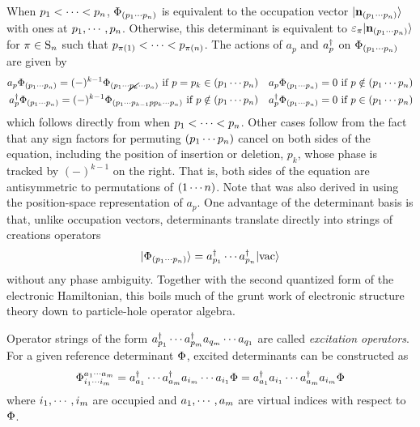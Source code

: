 \documentclass[11pt]{article}
\numberwithin{equation}{section}
\begin{document}
\begin{rmk}
When $p_1<\cdots<p_n$, $\Phi _{(p_1\cdots p_n)}$ is equivalent to the occupation vector $|\mathbf{n}_{(p_1\cdots p_n)}\rangle$ with ones at $p_1,\cdots,p_n$.
Otherwise, this determinant is equivalent to $\e_{\pi}\kt{\bo{n}_{(p_1\cd p_n)}}$ for $\pi\in\mr{S}_n$ such that $p_{\pi(1)}<\cd<p_{\pi(n)}$.
The actions of $a_p$ and $a_p^\dagger$ on $\Phi _{(p_1\cdots p_n)}$ are given by
\begin{align}\label{eq:abstract-annihilation-operator-action}
  a_p\Phi _{(p_1\cdots p_n)}
=
  (-)^{k-1}\Phi _{(p_1\cdots\cancel{p_k}\cdots p_n)}
  \ \text{if $p=p_k\in(p_1\cdots p_n)$}
&&
  a_p\Phi _{(p_1\cdots p_n)}
=
  0
  \ \text{if $p\notin(p_1\cdots p_n)$}
\\\label{eq:abstract-creation-operator-action}
  a_p^\dagger\Phi _{(p_1\cdots p_n)}
=
  (-)^{k-1}\Phi _{(p_1\cdots p_{k-1}pp_k\cdots p_n)}
  \ \text{if $p\notin(p_1\cdots p_n)$}
&&
  a_p^\dagger\Phi _{(p_1\cdots p_n)}
=
  0
  \ \text{if $p\in(p_1\cdots p_n)$}
\end{align}
which follows directly from  when $p_1<\cdots<p_n$.
Other cases follow from the fact that any sign factors for permuting $(p_1\cdots p_n)$ cancel on both sides of the equation, including the position of insertion or deletion, $p_k$, whose phase is tracked by $(-)^{k-1}$ on the right.
That is, both sides of the equation are antisymmetric to permutations of $(1\cdots n)$.
Note that  was also derived in  using the position-space representation of $a_p$.
One advantage of the determinant basis is that, unlike occupation vectors, determinants translate directly into strings of creations operators
\begin{align}
  |\Phi _{(p_1\cdots p_n)}\rangle
=
  a_{p_1}^\dagger\cdots a_{p_n}^\dagger|\mathrm{vac}\rangle
\end{align}
without any phase ambiguity.
Together with the second quantized form of the electronic Hamiltonian, this boils much of the grunt work of electronic structure theory down to particle-hole operator algebra.
\end{rmk}

\begin{dfn}
Operator strings of the form $a_{p_1}^\dagger\cdots a_{p_m}^\dagger a_{q_m}\cdots a_{q_1}$ are called \textit{excitation operators}.
For a given reference determinant $\Phi $, excited determinants can be constructed as
\begin{align}
  \Phi _{i_1\cdots i_m}^{a_1\cdots a_m}
=
  a_{a_1}^\dagger\cdots a_{a_m}^\dagger a_{i_m}\cdots a_{i_1}\Phi 
=
  a_{a_1}^\dagger a_{i_1}\cdots a_{a_m}^\dagger a_{i_m}\Phi 
\end{align}
where $i_1,\cdots,i_m$ are occupied and $a_1,\cdots,a_m$ are virtual indices with respect to $\Phi $.
\end{dfn}
\end{document}
